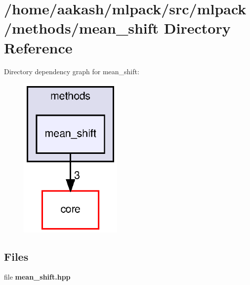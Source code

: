 \section{/home/aakash/mlpack/src/mlpack/methods/mean\+\_\+shift Directory Reference}
\label{dir_bea58545a892a685c577b438a573964d}
Directory dependency graph for mean\+\_\+shift\+:
\nopagebreak
\begin{figure}[H]
\begin{center}
\leavevmode
\includegraphics[width=142pt]{dir_bea58545a892a685c577b438a573964d_dep}
\end{center}
\end{figure}
\subsection*{Files}
\begin{DoxyCompactItemize}
\item 
file \textbf{ mean\+\_\+shift.\+hpp}
\end{DoxyCompactItemize}
